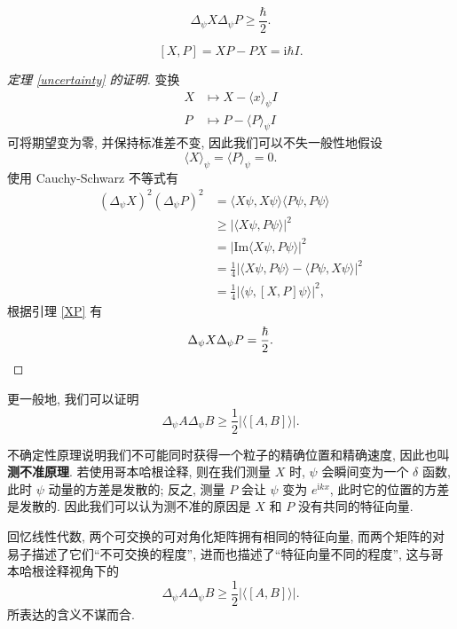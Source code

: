 \begin{theorem}[不确定性原理]\keepline
    \label{uncertainty}
    \[ \Delta_\psi X\Delta_\psi P\geqslant\frac{\hbar}{2}. \]
\end{theorem}
\vspace{0ex}
\begin{lemma}\keepline
    \label{XP}
    \[ [X,P]=XP-PX=\mathrm{i}\hbar I. \]
\end{lemma}
\begin{proof}[定理 \ref{uncertainty} 的证明]
    变换
    \begin{align*}
        X&\mapsto X-\langle x\rangle_\psi I\\
        P&\mapsto P-\langle P\rangle_\psi I
    \end{align*}
    可将期望变为零, 并保持标准差不变, 因此我们可以不失一般性地假设 
    \[ \langle X\rangle_\psi=\langle P\rangle_\psi=0. \]
    使用 Cauchy-Schwarz 不等式有
    \begin{align*}
        (\Delta_\psi X)^2(\Delta_\psi P)^2 &=\langle X\psi,X\psi\rangle\langle P\psi,P\psi\rangle\\ 
        &\geqslant |\langle X\psi,P\psi\rangle|^2\\ 
        &= |\mathrm{Im}\langle X\psi,P\psi\rangle|^2\\ 
        &=\frac{1}{4}|\langle X\psi,P\psi\rangle-\langle P\psi,X\psi\rangle|^2\\ 
        &=\frac{1}{4}|\langle\psi,[X,P]\psi\rangle|^2,
    \end{align*}
    根据引理 \ref{XP} 有
    \[ \Delta_\psi X\Delta_\psi P=\frac{\hbar}{2}.\qedhere \]
\end{proof}
\begin{remark}
    更一般地, 我们可以证明
    \[ \Delta_\psi A\Delta_\psi B\geqslant\frac{1}{2}|\langle [A,B]\rangle|. \]
\end{remark}

不确定性原理说明我们不可能同时获得一个粒子的精确位置和精确速度, 因此也叫{\bf 测不准原理}. 若使用哥本哈根诠释, 则在我们测量 $ X $ 时, $ \psi $ 会瞬间变为一个 $ \delta $ 函数, 此时 $ \psi $ 动量的方差是发散的; 反之, 测量 $ P $ 会让 $ \psi $ 变为 $ e^{\mathrm{i}kx} $, 此时它的位置的方差是发散的. 因此我们可以认为测不准的原因是 $ X $ 和 $ P $ 没有共同的特征向量. 

回忆线性代数, 两个可交换的可对角化矩阵拥有相同的特征向量, 而两个矩阵的对易子描述了它们``不可交换的程度'', 进而也描述了``特征向量不同的程度'', 这与哥本哈根诠释视角下的
\[ \Delta_\psi A\Delta_\psi B\geqslant\frac{1}{2}|\langle [A,B]\rangle|. \]
所表达的含义不谋而合.

